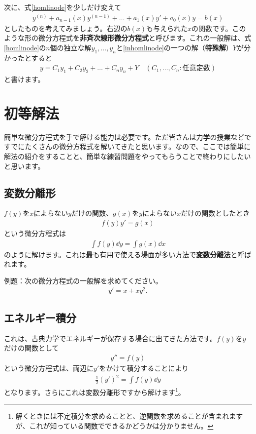 \documentclass[report,paper=a4, fontsize=12pt, line_length=16cm, number_of_lines=33,dvipdfmx]{jlreq}
\numberwithin{equation}{section}
\newcommand{\strong}[1]{\textsf{\bfseries #1}}
\begin{document}
次に、式\eqref{homlinode}を少しだけ変えて
\begin{align}
  y^{(n)}+a_{n-1}(x)y^{(n-1)}+\dots+a_1(x)y'+a_0(x)y=b(x)
  \label{inhomlinode}
\end{align}
としたものを考えてみましょう。右辺の$b(x)$も与えられた$x$の関数です。このような形の微分方程式を\strong{非斉次線形微分方程式}と呼びます。これの一般解は、式\eqref{homlinode}の$n$個の独立な解$y_1,\dots,y_n$と\eqref{inhomlinode}の一つの解（\strong{特殊解}）$Y$が分かったとすると
\begin{align}
  y=C_1y_1+C_2y_2+\dots+C_ny_n+Y\quad (C_1,\dots,C_n:\text{任意定数})
\end{align}
と書けます。

\section{初等解法}
簡単な微分方程式を手で解ける能力は必要です。ただ皆さんは力学の授業などですでにたくさんの微分方程式を解いてきたと思います。なので、ここでは簡単に解法の紹介をすることと、簡単な練習問題をやってもらうことで終わりにしたいと思います。

\subsection{変数分離形}
$f(y)$を$x$によらない$y$だけの関数、$g(x)$を$y$によらない$x$だけの関数としたとき
\begin{align}
  f(y)y'=g(x)
\end{align}
という微分方程式は
\begin{align}
  \int f(y)\dd{y}=\int g(x)\dd{x}
\end{align}
のように解けます。これは最も有用で使える場面が多い方法で\strong{変数分離法}と呼ばれます。

例題：次の微分方程式の一般解を求めてください。
\begin{align}
  y'=x+xy^2.
\end{align}

\subsection{エネルギー積分}
これは、古典力学でエネルギーが保存する場合に出てきた方法です。$f(y)$を$y$だけの関数として
\begin{align}
  y''=f(y)
\end{align}
という微分方程式は、両辺に$y'$をかけて積分することにより
\begin{align}
  \frac12 (y')^2=\int f(y)\dd{y}
\end{align}
となります。さらにこれは変数分離形ですから解けます\footnote{解くときには不定積分を求めることと、逆関数を求めることが含まれますが、これが知っている関数でできるかどうかは分かりません。}。
\end{document}

